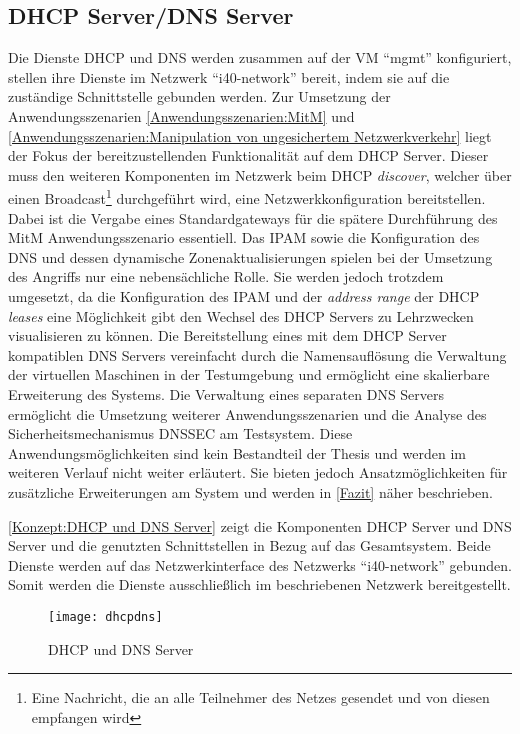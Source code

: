 \subsection{\ac{DHCP} Server/\ac{DNS} Server}
Die Dienste \ac{DHCP} und \ac{DNS} werden zusammen auf der \ac{VM} "`mgmt"' konfiguriert, stellen ihre Dienste im Netzwerk "`i40-network"' bereit, indem sie auf die zuständige Schnittstelle gebunden werden. Zur Umsetzung der Anwendungsszenarien \autoref{Anwendungsszenarien:MitM} und \autoref{Anwendungsszenarien:Manipulation von ungesichertem Netzwerkverkehr} liegt der Fokus der bereitzustellenden Funktionalität auf dem \ac{DHCP} Server. Dieser muss den weiteren Komponenten im Netzwerk beim \ac{DHCP} \textit{discover}, welcher über einen Broadcast\footnote{Eine Nachricht, die an alle Teilnehmer des Netzes gesendet und von diesen empfangen wird} durchgeführt wird, eine Netzwerkkonfiguration bereitstellen. Dabei ist die Vergabe eines Standardgateways für die spätere Durchführung des \ac{MitM} Anwendungsszenario essentiell. Das \ac{IPAM} sowie die Konfiguration des \ac{DNS} und dessen dynamische Zonenaktualisierungen spielen bei der Umsetzung des Angriffs nur eine nebensächliche Rolle. Sie werden jedoch trotzdem umgesetzt, da die Konfiguration des \ac{IPAM} und der \textit{address range} der \ac{DHCP} \textit{leases} eine Möglichkeit gibt den Wechsel des \ac{DHCP} Servers zu Lehrzwecken visualisieren zu können. Die Bereitstellung eines mit dem \ac{DHCP} Server kompatiblen \ac{DNS} Servers vereinfacht durch die Namensauflösung die Verwaltung der virtuellen Maschinen in der Testumgebung und ermöglicht eine skalierbare Erweiterung des Systems. Die Verwaltung eines separaten \ac{DNS} Servers ermöglicht die Umsetzung weiterer Anwendungsszenarien und die Analyse des Sicherheitsmechanismus \ac{DNSSEC} am Testsystem. Diese Anwendungsmöglichkeiten sind kein Bestandteil der Thesis und werden im weiteren Verlauf nicht weiter erläutert. Sie bieten jedoch Ansatzmöglichkeiten für zusätzliche Erweiterungen am System und werden in \autoref{Fazit} näher beschrieben.

\autoref{Konzept:DHCP und DNS Server} zeigt die Komponenten \ac{DHCP} Server und \ac{DNS} Server und die genutzten Schnittstellen in Bezug auf das Gesamtsystem. Beide Dienste werden auf das Netzwerkinterface des Netzwerks "`i40-network"' gebunden. Somit werden die Dienste ausschließlich im beschriebenen Netzwerk bereitgestellt.

\begin{figure}[h]
  \centering
  \texttt{[image: dhcpdns]}
  \caption{DHCP und DNS Server} 
  \label{Konzept:DHCP und DNS Server}
\end{figure}

